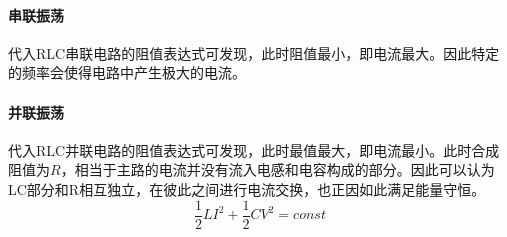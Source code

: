 \paragraph{串联振荡} 代入RLC串联电路的阻值表达式可发现，此时阻值最小，即电流最大。因此特定的频率会使得电路中产生极大的电流。
\paragraph{并联振荡} 代入RLC并联电路的阻值表达式可发现，此时最值最大，即电流最小。此时合成阻值为$R$，相当于主路的电流并没有流入电感和电容构成的部分。因此可以认为LC部分和R相互独立，在彼此之间进行电流交换，也正因如此满足能量守恒。
\begin{equation*}
    \frac12LI^2+\frac12CV^2=const
\end{equation*}
